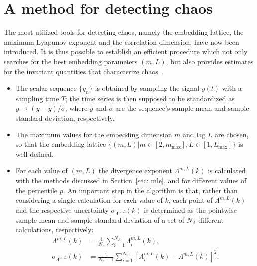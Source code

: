 \section{A method for detecting chaos}\label{sec: method for chaos}

The most utilized tools for detecting chaos, namely the embedding lattice, the maximum Lyapunov exponent
and the correlation dimension, have now been introduced.
It is thus possible to establish an efficient procedure which not only searches for the best
embedding parameters $(m,L)$, but also provides estimates for the invariant quantities that
characterize chaos~\cite{ref:perinelli2020chasing}.

\begin{itemize}

\item
The scalar sequence $\{y_n\}$ is obtained by sampling the signal $y(t)$ with a sampling time $T$;
the time series is then supposed to be standardized as
$y \rightarrow (y - \bar{y})/\bar{\sigma}$, where $\bar{y}$ and $\bar{\sigma}$ are the sequence's
sample mean and sample standard deviation, respectively.


\item
The maximum values for the embedding dimension $m$ and lag $L$ are chosen, so that the embedding
lattice $\{(m,L)|m\in[2,m_{\max}],L\in[1,L_{\max}]\}$ is well defined.


\item
For each value of $(m,L)$ the divergence exponent $\Lambda^{m,L}(k)$ is calculated with the methods
discussed in Section~\ref{sec: mle}, and for different values of the percentile $p$.
An important step in the algorithm is that, rather than
considering a single calculation for each value of $k$, each point of $\Lambda^{m,L}(k)$
and the respective uncertainty $\sigma_{\Lambda^{m,L}}(k)$ is determined
as the pointwise sample mean and sample standard
deviation of a set of $N_\Lambda$ different calculations, respectively:
\begin{equation}
\begin{aligned}
    \label{eq: sample mean divergence exponent}
    \Lambda^{m,L}(k)&=\frac{1}{N_\Lambda}\sum_{i=1}^{N_\Lambda}\Lambda_i^{m,L}(k),\\
    \sigma_{\Lambda^{m,L}}(k) &= \frac{1}{N_\Lambda-1}\sum_{i=1}^{N_\Lambda}{\left[
        \Lambda_i^{m,L}(k)-\Lambda^{m,L}(k)
    \right]}^2.
\end{aligned}
\end{equation}



\end{itemize}
